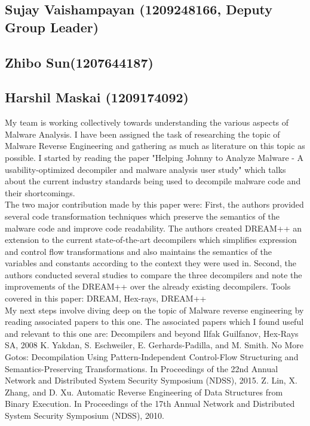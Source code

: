 \documentclass[16pt]{article}
\begin{document}
		\subsection{Sujay Vaishampayan (1209248166, Deputy Group Leader)}
		\subsection{Zhibo Sun(1207644187)}
		\subsection{Harshil Maskai (1209174092)}
		My team is working collectively towards understanding the various aspects of Malware Analysis. I have been assigned the task of researching the topic of Malware Reverse Engineering and gathering as much as literature on this topic as possible. I started by reading the paper "Helping Johnny to Analyze Malware - A usability-optimized decompiler and malware analysis user study" which talks about the current industry standards being used to decompile malware code and their shortcomings. \\
		The two major contribution made by this paper were:
		First, the authors provided several code transformation techniques which preserve the semantics of the malware code and improve code readability. The authors created DREAM++ an extension to the current state-of-the-art decompilers which simplifies expression and control flow transformations and also maintains the semantics of the variables and constants according to the context they were used in.
		Second, the authors conducted several studies to compare the three decompilers and note the improvements of the DREAM++ over the already existing decompilers.
		Tools covered in this paper: DREAM, Hex-rays, DREAM++\\
		
		My next steps involve diving deep on the topic of Malware reverse engineering by reading associated papers to this one. 
		The associated papers which I found useful and relevant to this one are:
		Decompilers and beyond Ilfak Guilfanov, Hex-Rays SA, 2008 
		K. Yakdan, S. Eschweiler, E. Gerhards-Padilla, and M. Smith. No More Gotos: Decompilation Using Pattern-Independent Control-Flow Structuring and Semantics-Preserving Transformations. In Proceedings of the 22nd Annual Network and Distributed System Security Symposium (NDSS), 2015.
		Z. Lin, X. Zhang, and D. Xu. Automatic Reverse Engineering of Data Structures from Binary Execution. In Proceedings of the 17th Annual Network and Distributed System Security Symposium (NDSS), 2010.
		
\end{document}
